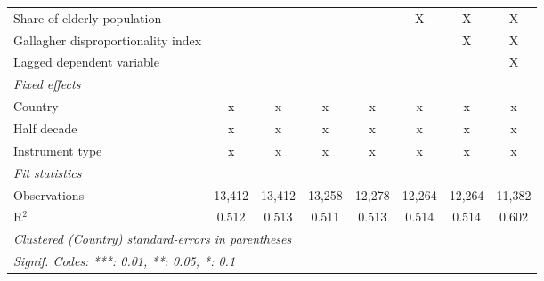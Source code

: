 \begin{tabular}{lccccccc}
   Share of elderly population                                         &                &               &              &              & X             & X             & X\\  
   Gallagher disproportionality index                                  &                &               &              &              &               & X             & X\\  
   Lagged dependent variable                                           &                &               &              &              &               &               & X\\  
   \emph{Fixed effects}\\
   Country                                                             & x              & x             & x            & x            & x             & x             & x\\  
   Half decade                                                         & x              & x             & x            & x            & x             & x             & x\\  
   Instrument type                                                     & x              & x             & x            & x            & x             & x             & x\\  
   \midrule \emph{Fit statistics}\\
   Observations                                                        & 13,412         & 13,412        & 13,258       & 12,278       & 12,264        & 12,264        & 11,382\\  
   R$^2$                                                               & 0.512          & 0.513         & 0.511        & 0.513        & 0.514         & 0.514         & 0.602\\  
   \midrule
   \multicolumn{8}{l}{\emph{Clustered (Country) standard-errors in parentheses}}\\
   \multicolumn{8}{l}{\emph{Signif. Codes: ***: 0.01, **: 0.05, *: 0.1}}\\
\end{tabular}
\par\endgroup


